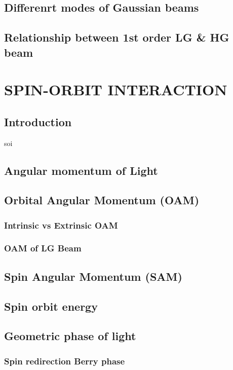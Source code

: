 \documentclass[11pt,a4paper]{article}
\numberwithin{equation}{section}
\begin{document}
\subsection{Differenrt modes of Gaussian beams}

\subsection{Relationship between 1st order LG \& HG beam}

\clearpage
\section{SPIN-ORBIT INTERACTION}
\subsection{Introduction}
soi
\subsection{Angular momentum of Light}

\subsection{Orbital Angular Momentum (OAM)}
\subsubsection{Intrinsic vs Extrinsic OAM}

\subsubsection{OAM of LG Beam}

\subsection{Spin Angular Momentum (SAM)}

\subsection{Spin orbit energy}

\subsection{Geometric phase of light}
\subsubsection{Spin redirection Berry phase}
\end{document}
